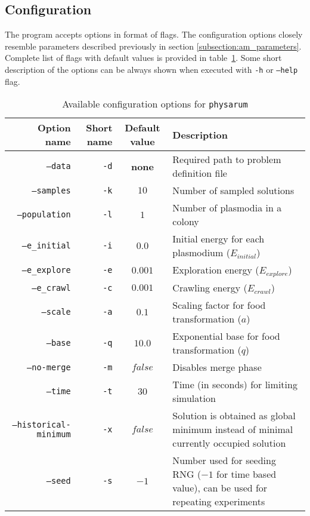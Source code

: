 \subsection{Configuration}

The program accepts options in format of flags. The configuration options closely resemble parameters described previously in section \ref{subsection:am_parameters}. Complete list of flags with default values is provided in table~\ref{table:pi_options}. Some short description of the options can be always shown when executed with \texttt{-h} or \texttt{--help} flag.

\begin{table}[h]
  \centering
  \caption{Available configuration options for \texttt{physarum}}
  \label{table:pi_options}
  \begin{tabularx}{\textwidth}{r|r|c|X}
    Option name & Short name & Default value & Description \\ \hline \hline
    \texttt{--data} & \texttt{-d} & \textbf{none} & Required path to problem definition file \\ \hline
    \texttt{--samples} & \texttt{-k} & $10$ & Number of sampled solutions \\ \hline
    \texttt{--population} & \texttt{-l} & $1$ & Number of plasmodia in a colony \\ \hline
    \texttt{--e\_initial} & \texttt{-i} & $0.0$ & Initial energy for each plasmodium ($E_{initial}$) \\ \hline
    \texttt{--e\_explore} & \texttt{-e} & $0.001$ & Exploration energy ($E_{explore}$) \\ \hline
    \texttt{--e\_crawl} & \texttt{-c} & $0.001$ & Crawling energy ($E_{crawl}$) \\ \hline
    \texttt{--scale} & \texttt{-a} & $0.1$ & Scaling factor for food transformation ($a$) \\ \hline
    \texttt{--base} & \texttt{-q} & $10.0$ & Exponential base for food transformation ($q$) \\ \hline
    \texttt{--no-merge} & \texttt{-m} & $false$ & Disables merge phase \\ \hline
    \texttt{--time} & \texttt{-t} & $30$ & Time (in seconds) for limiting simulation \\ \hline
    \texttt{--historical-minimum} & \texttt{-x} & $false$ & Solution is obtained as global minimum instead of minimal currently occupied solution \\ \hline
    \texttt{--seed} & \texttt{-s} & $-1$ & Number used for seeding RNG ($-1$ for time based value), can be used for repeating experiments \\ \hline \hline
  \end{tabularx}
\end{table}

